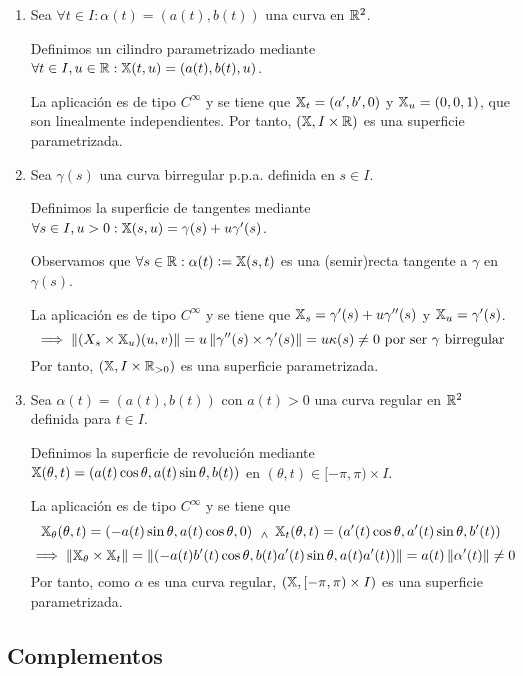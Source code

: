 \begin{enumerate}
	\item {} Sea $\forall t \in I : \alpha(t) = \left(a(t), b(t)\right)$ una curva en $\mathbb{R}^2$.

	      Definimos un cilindro parametrizado mediante $\forall t \in I, u \in \mathbb{R} : \mathbb{X}(t, u) = \left(a(t), b(t), u\right)$.

	      La aplicación es de tipo $C^\infty$ y se tiene que $\mathbb{X}_t = \left(a', b', 0\right)$ y $\mathbb{X}_u = \left(0, 0, 1\right)$, que son linealmente independientes. Por tanto, $(\mathbb{X}, I \times \mathbb{R})$ es una superficie parametrizada.
	\item {} Sea $\gamma(s)$ una curva birregular p.p.a. definida en $s\in I$.

	      Definimos la superficie de tangentes mediante $\forall s \in I, u>0 : \mathbb{X}(s, u) = \gamma(s) + u \gamma'(s)$.

	      Observamos que $\forall s \in \mathbb{R} : \alpha(t) \vcentcolon= \mathbb{X}(s, t)$ es una (semir)recta tangente a $\gamma$ en $\gamma(s)$.

	      La aplicación es de tipo $C^\infty$ y se tiene que $\mathbb{X}_s = \gamma'(s) + u\gamma''(s)$ y $\mathbb{X}_u = \gamma'(s)$.
	      \[\implies \left\Vert(X_s \times \mathbb{X}_u)(u,v)\right\Vert = u\left\Vert\gamma''(s) \times \gamma'(s)\right\Vert = u \kappa(s) \neq 0 \text{ por ser $\gamma$ birregular}\]
	      Por tanto, $(\mathbb{X}, I \times \mathbb{R}_{>0})$ es una superficie parametrizada.
	\item {} Sea $\alpha(t) = \left(a(t), b(t)\right)$ con $a(t) > 0$ una curva regular en $\mathbb{R}^2$ definida para $t \in I$.

	      Definimos la superficie de revolución mediante $\mathbb{X}(\theta, t) = \left(a(t) \cos \theta, a(t) \sin \theta, b(t)\right)$ en $(\theta, t) \in [-\pi, \pi) \times I$.

	      La aplicación es de tipo $C^\infty$ y se tiene que
	      \[\mathbb{X}_\theta(\theta, t) = \left(-a(t) \sin \theta, a(t) \cos \theta, 0\right) \, \; _{\wedge} \; \, \mathbb{X}_t(\theta, t) = \left(a'(t) \cos \theta, a'(t) \sin \theta, b'(t)\right)\]
	      \[\implies \left\Vert\mathbb{X}_\theta \times \mathbb{X}_t\right\Vert = \left\Vert\left(-a(t) b'(t) \cos \theta, b(t)a'(t)\sin\theta, a(t)a'(t)\right)\right\Vert = a(t) \left\Vert\alpha'(t)\right\Vert \neq 0\]
	      Por tanto, como $\alpha$ es una curva regular, $(\mathbb{X}, [-\pi, \pi) \times I)$ es una superficie parametrizada.
\end{enumerate}

\subsection{Complementos}

